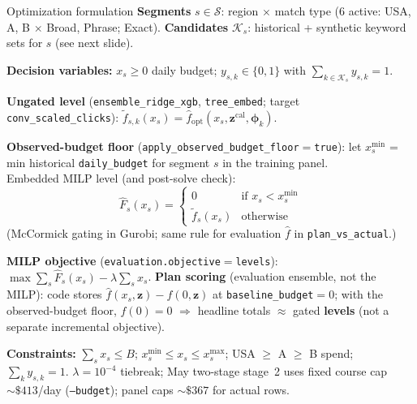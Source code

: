 \documentclass[11pt]{beamer}
\begin{document}
\begin{frame}{Optimization formulation}
  \small
  \textbf{Segments} $s \in \mathcal{S}$: region $\times$ match type (6 active: USA, A, B $\times$ Broad, Phrase; Exact).
  \textbf{Candidates} $\mathcal{K}_s$: historical + synthetic keyword sets for $s$ (see next slide).

  \textbf{Decision variables:}
  $x_s \geq 0$ daily budget;\;
  $y_{s,k} \in \{0,1\}$ with $\sum_{k \in \mathcal{K}_s} y_{s,k} = 1$.

  \textbf{Ungated level} (\texttt{ensemble\_ridge\_xgb}, \texttt{tree\_embed}; target \texttt{conv\_scaled\_clicks}):
  $\tilde{f}_{s,k}(x_s)=\hat f_{\mathrm{opt}}(x_s,\mathbf{z}^{\mathrm{cal}},\boldsymbol{\phi}_k)$.

  \textbf{Observed-budget floor} (\texttt{apply\_observed\_budget\_floor}${=}$\texttt{true}):
  let $x_s^{\min}$ = min historical \texttt{daily\_budget} for segment $s$ in the training panel.\\
  Embedded MILP level (and post-solve check):
  \[
    \widehat{F}_s(x_s)=
    \begin{cases}
      0 & \text{if } x_s < x_s^{\min} \\
      \tilde{f}_s(x_s) & \text{otherwise}
    \end{cases}
  \]
  (McCormick gating in Gurobi; same rule for evaluation $\hat f$ in \texttt{plan\_vs\_actual}.)

  \textbf{MILP objective} (\texttt{evaluation.objective}${=}$\texttt{levels}):
  $\max \sum_s \widehat{F}_s(x_s) - \lambda\sum_s x_s$.
  \textbf{Plan scoring} (evaluation ensemble, not the MILP): code stores
  $\hat f(x_s,\mathbf{z})-\hat f(0,\mathbf{z})$ at \texttt{baseline\_budget}${=}0$; with the observed-budget floor, $\hat f(0){=}0$ $\Rightarrow$ headline totals $\approx$ gated \textbf{levels} (not a separate incremental objective).

  \textbf{Constraints:}
  $\sum_s x_s \leq B$;\;
  $x^{\min}_s \leq x_s \leq x^{\max}_s$;\;
  USA $\geq$ A $\geq$ B spend;\;
  $\sum_k y_{s,k}=1$.
  {\scriptsize $\lambda{=}10^{-4}$ tiebreak; May two-stage stage~2 uses fixed course cap ${\sim}\$413$/day (\texttt{--budget}); panel caps ${\sim}\$367$ for actual rows.}
  \normalsize
\end{frame}
\end{document}
